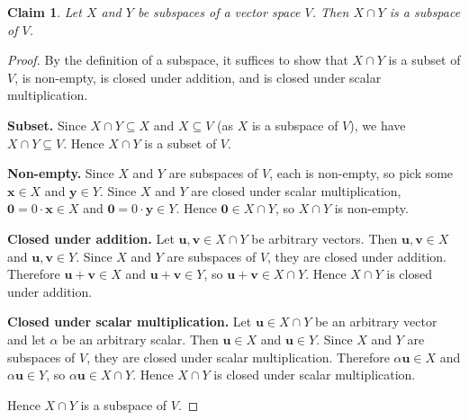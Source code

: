 \documentclass{article}
\newtheorem*{claim}{Claim}
\begin{document}
\begin{claim}
    Let $X$ and $Y$ be subspaces of a vector space $V$. Then $X \cap Y$ is a subspace of $V$.
\end{claim}

\begin{proof}
    By the definition of a subspace, it suffices to show that $X \cap Y$ is a subset of $V$, is non-empty, is 
    closed under addition, and is closed under scalar multiplication.

    \medskip
    \textbf{Subset.} Since $X \cap Y \subseteq X$ and $X \subseteq V$ (as $X$ is a subspace of $V$), we have 
    $X \cap Y \subseteq V$. Hence $X \cap Y$ is a subset of $V$.

    \medskip
    \textbf{Non-empty.} Since $X$ and $Y$ are subspaces of $V$, each is non-empty, so pick some 
    $\mathbf{x} \in X$ and $\mathbf{y} \in Y$. Since $X$ and $Y$ are closed under scalar multiplication, 
    $\mathbf{0} = 0 \cdot \mathbf{x} \in X$ and $\mathbf{0} = 0 \cdot \mathbf{y} \in Y$. Hence 
    $\mathbf{0} \in X \cap Y$, so $X \cap Y$ is non-empty.

    \medskip
    \textbf{Closed under addition.} Let $\mathbf{u}, \mathbf{v} \in X \cap Y$ be arbitrary vectors. Then 
    $\mathbf{u}, \mathbf{v} \in X$ and $\mathbf{u}, \mathbf{v} \in Y$. Since $X$ and $Y$ are subspaces of 
    $V$, they are closed under addition. Therefore $\mathbf{u} + \mathbf{v} \in X$ and 
    $\mathbf{u} + \mathbf{v} \in Y$, so $\mathbf{u} + \mathbf{v} \in X \cap Y$. Hence $X \cap Y$ is closed 
    under addition.

    \medskip
    \textbf{Closed under scalar multiplication.} Let $\mathbf{u} \in X \cap Y$ be an arbitrary vector and let 
    $\alpha$ be an arbitrary scalar. Then $\mathbf{u} \in X$ and $\mathbf{u} \in Y$. Since $X$ and $Y$ are 
    subspaces of $V$, they are closed under scalar multiplication. Therefore $\alpha \mathbf{u} \in X$ and 
    $\alpha \mathbf{u} \in Y$, so $\alpha \mathbf{u} \in X \cap Y$. Hence $X \cap Y$ is closed under scalar 
    multiplication.

    \medskip

    Hence $X \cap Y$ is a subspace of $V$.
\end{proof}
\end{document}
